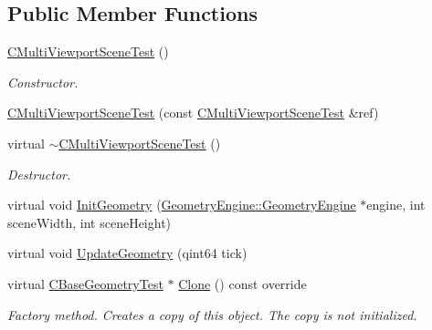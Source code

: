 \subsection*{Public Member Functions}
\begin{DoxyCompactItemize}
\item 
\mbox{\label{class_unit_test_1_1_c_multi_viewport_scene_test_a8290f045f0cf7a082902e3738f9810f3}} 
\mbox{\hyperlink{class_unit_test_1_1_c_multi_viewport_scene_test_a8290f045f0cf7a082902e3738f9810f3}{C\+Multi\+Viewport\+Scene\+Test}} ()
\begin{DoxyCompactList}\small\item\em Constructor. \end{DoxyCompactList}\item 
\mbox{\hyperlink{class_unit_test_1_1_c_multi_viewport_scene_test_a0246a2fc96cdb3818edd3f81de68ca62}{C\+Multi\+Viewport\+Scene\+Test}} (const \mbox{\hyperlink{class_unit_test_1_1_c_multi_viewport_scene_test}{C\+Multi\+Viewport\+Scene\+Test}} \&ref)
\item 
\mbox{\label{class_unit_test_1_1_c_multi_viewport_scene_test_a10f7b78de678980f9582c095ae33b565}} 
virtual \mbox{\hyperlink{class_unit_test_1_1_c_multi_viewport_scene_test_a10f7b78de678980f9582c095ae33b565}{$\sim$\+C\+Multi\+Viewport\+Scene\+Test}} ()
\begin{DoxyCompactList}\small\item\em Destructor. \end{DoxyCompactList}\item 
virtual void \mbox{\hyperlink{class_unit_test_1_1_c_multi_viewport_scene_test_a954d1ab145ef09a12976d9f3a730a127}{Init\+Geometry}} (\mbox{\hyperlink{class_geometry_engine_1_1_geometry_engine}{Geometry\+Engine\+::\+Geometry\+Engine}} $\ast$engine, int scene\+Width, int scene\+Height)
\item 
virtual void \mbox{\hyperlink{class_unit_test_1_1_c_multi_viewport_scene_test_a1a321eb10c463501feb70cb61b1add01}{Update\+Geometry}} (qint64 tick)
\item 
\mbox{\label{class_unit_test_1_1_c_multi_viewport_scene_test_af1de990ff8b228fd155e7130eb6d1f1c}} 
virtual \mbox{\hyperlink{class_unit_test_1_1_c_base_geometry_test}{C\+Base\+Geometry\+Test}} $\ast$ \mbox{\hyperlink{class_unit_test_1_1_c_multi_viewport_scene_test_af1de990ff8b228fd155e7130eb6d1f1c}{Clone}} () const override
\begin{DoxyCompactList}\small\item\em Factory method. Creates a copy of this object. The copy is not initialized. \end{DoxyCompactList}\end{DoxyCompactItemize}
